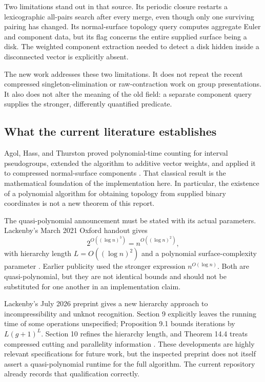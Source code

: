 Two limitations stand out in that source. Its periodic closure restarts a
lexicographic all-pairs search after every merge, even though only one
surviving pairing has changed. Its normal-surface topology query computes
aggregate Euler and component data, but its
 flag concerns the entire supplied surface being
a disk. The weighted component extraction needed to detect a disk hidden
inside a disconnected vector is explicitly absent.

The new work addresses these two limitations. It does not repeat the recent
compressed singleton-elimination or raw-contraction work on group
presentations. It also does not alter the meaning of the old
 field: a separate component query supplies the
stronger, differently quantified predicate.

\subsection{What the current literature establishes}

Agol, Hass, and Thurston proved polynomial-time counting for interval
pseudogroups, extended the algorithm to additive vector weights, and
applied it to compressed normal-surface components
\cite{AHT2006}. That classical result is the mathematical foundation of
the implementation here. In particular, the existence of a polynomial
algorithm for obtaining topology from supplied binary coordinates is not
a new theorem of this report.

The quasi-polynomial announcement must be stated with its actual
parameters. Lackenby's March 2021 Oxford handout gives
\[
 2^{O((\log n)^3)}
 =n^{O((\log n)^2)},
\]
with hierarchy length \(L=O((\log n)^2)\) and a polynomial surface-complexity
parameter \cite{Lackenby2021}. Earlier publicity used the stronger expression
\(n^{O(\log n)}\). Both are quasi-polynomial, but they are not identical
bounds and should not be substituted for one another in an implementation
claim.

Lackenby's July 2026 preprint gives a new hierarchy approach to
incompressibility and unknot recognition. Section 9 explicitly leaves the
running time of some operations unspecified; Proposition 9.1 bounds
iterations by \(L(g+1)^L\). Section 10 refines the hierarchy length, and
Theorem 14.4 treats compressed cutting and parallelity information
\cite{Lackenby2026}. These developments are highly relevant specifications
for future work, but the inspected preprint does not itself assert a
quasi-polynomial runtime for the full algorithm. The current repository
already records that qualification correctly.

